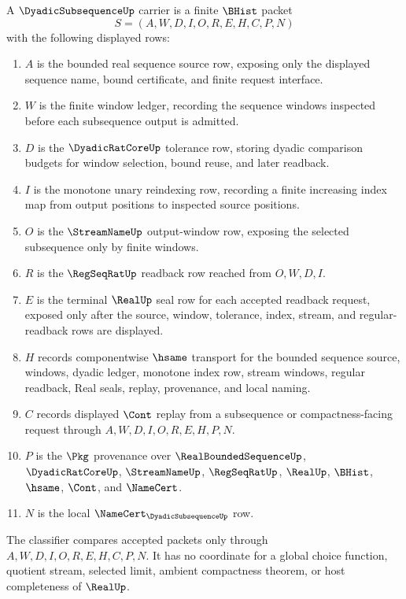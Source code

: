 \begin{definition}
\label{def:dyadic-subsequence-carrier}
A $\DyadicSubsequenceUp$ carrier is a finite $\BHist$ packet
$$
S=(A,W,D,I,O,R,E,H,C,P,N)
$$
with the following displayed rows:
\begin{enumerate}
\item $A$ is the bounded real sequence source row, exposing only the displayed sequence name, bound certificate, and finite request interface.
\item $W$ is the finite window ledger, recording the sequence windows inspected before each subsequence output is admitted.
\item $D$ is the $\DyadicRatCoreUp$ tolerance row, storing dyadic comparison budgets for window selection, bound reuse, and later readback.
\item $I$ is the monotone unary reindexing row, recording a finite increasing index map from output positions to inspected source positions.
\item $O$ is the $\StreamNameUp$ output-window row, exposing the selected subsequence only by finite windows.
\item $R$ is the $\RegSeqRatUp$ readback row reached from $O,W,D,I$.
\item $E$ is the terminal $\RealUp$ seal row for each accepted readback request, exposed only after the source, window, tolerance, index, stream, and regular-readback rows are displayed.
\item $H$ records componentwise $\hsame$ transport for the bounded sequence source, windows, dyadic ledger, monotone index row, stream windows, regular readback, Real seals, replay, provenance, and local naming.
\item $C$ records displayed $\Cont$ replay from a subsequence or compactness-facing request through $A,W,D,I,O,R,E,H,P,N$.
\item $P$ is the $\Pkg$ provenance over $\RealBoundedSequenceUp$, $\DyadicRatCoreUp$, $\StreamNameUp$, $\RegSeqRatUp$, $\RealUp$, $\BHist$, $\hsame$, $\Cont$, and $\NameCert$.
\item $N$ is the local $\NameCert_{\DyadicSubsequenceUp}$ row.
\end{enumerate}
The classifier compares accepted packets only through $A,W,D,I,O,R,E,H,C,P,N$. It has no coordinate for a global choice function, quotient stream, selected limit, ambient compactness theorem, or host completeness of $\RealUp$.
\end{definition}

